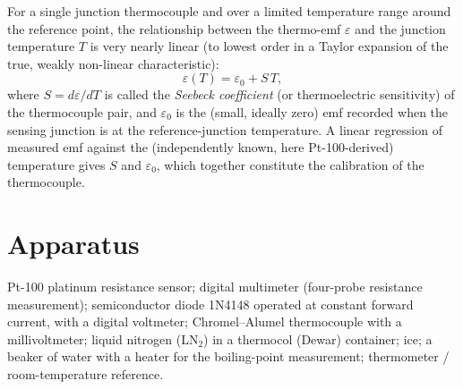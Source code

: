 \documentclass[11pt,a4paper]{article}
\begin{document}
For a single junction thermocouple and over a limited temperature range around the reference point, the relationship between the thermo-emf $\varepsilon$ and the junction temperature $T$ is very nearly linear (to lowest order in a Taylor expansion of the true, weakly non-linear characteristic):
\begin{equation}
    \varepsilon(T) = \varepsilon_0 + S\,T,
    \label{eq:thermocouple}
\end{equation}
where $S = d\varepsilon/dT$ is called the \emph{Seebeck coefficient} (or thermoelectric sensitivity) of the thermocouple pair, and $\varepsilon_0$ is the (small, ideally zero) emf recorded when the sensing junction is at the reference-junction temperature. A linear regression of measured emf against the (independently known, here Pt-100-derived) temperature gives $S$ and $\varepsilon_0$, which together constitute the calibration of the thermocouple.

\section{Apparatus}
Pt-100 platinum resistance sensor; digital multimeter (four-probe resistance measurement); semiconductor diode 1N4148 operated at constant forward current, with a digital voltmeter; Chromel--Alumel thermocouple with a millivoltmeter; liquid nitrogen (LN$_2$) in a thermocol (Dewar) container; ice; a beaker of water with a heater for the boiling-point measurement; thermometer / room-temperature reference.
\end{document}
